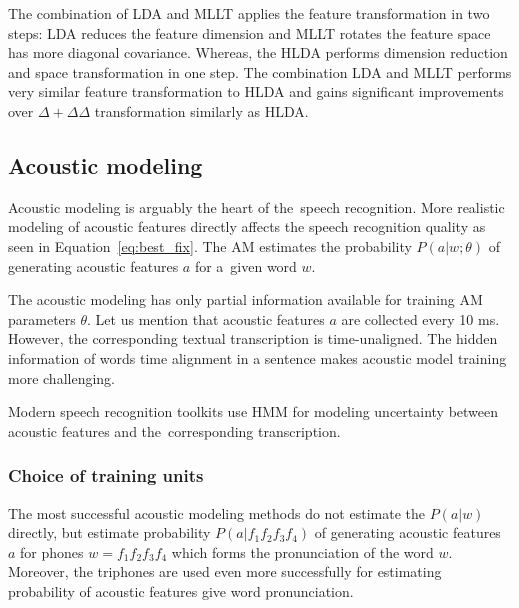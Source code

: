 {The combination of \ac{LDA} and \ac{MLLT} applies the feature transformation in two steps: \ac{LDA} reduces the feature dimension and \ac{MLLT} rotates the feature space  has more diagonal covariance\cite{gopinath1998maximum}.
Whereas, the \ac{HLDA} performs dimension reduction and space transformation in one step.\cite{gales1999semi}
The combination \ac{LDA} and \ac{MLLT} performs very similar feature transformation to \ac{HLDA} and gains significant improvements over $\Delta+\Delta\Delta$ transformation similarly as \ac{HLDA}\cite{gales1999semi}\cite{gopinath1998maximum}.


\subsection{Acoustic modeling}
\label{sub:am}
Acoustic modeling is arguably the heart of the~speech recognition.
More realistic modeling of acoustic features directly affects the speech recognition quality as seen in Equation~\ref{eq:best_fix}. 
The \ac{AM} estimates the probability $P(a|w; \theta)$ of generating acoustic features $a$ for a~given word $w$.

The acoustic modeling has only partial information available for training \ac{AM} parameters $\theta$.
Let us mention that acoustic features $a$ are collected every 10 ms.
However, the corresponding textual transcription is time-unaligned.
The hidden information of words time alignment in a sentence makes acoustic model training more challenging.

Modern speech recognition toolkits use \acl{HMM}
for modeling uncertainty between acoustic features and the~corresponding transcription. 

\subsubsection*{Choice of training units}
The most successful acoustic modeling methods do not estimate the $P(a|w)$ directly, but estimate probability $P(a|f_1f_2f_3f_4)$ of generating acoustic features $a$ for phones $w=f_1f_2f_3f_4$ which forms the pronunciation of the word $w$. Moreover, the triphones are used even more successfully for estimating probability of acoustic features give word pronunciation.

}
